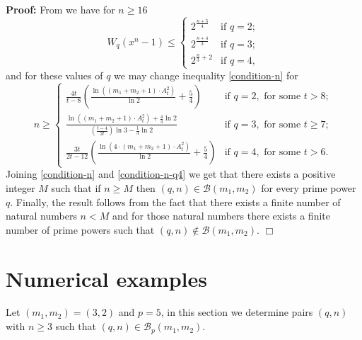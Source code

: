 \documentclass[12pt]{article}
\newenvironment{proof}{\noindent \textbf{Proof: }}{\hfill
$\Box$  \vspace{1ex}}
\def\Bb {\mathcal{B}}
\begin{document}
\begin{proof}
	From \cite[Lemma 2.11]{Lenstra} we have for $n \geq 16$
	$$
	W_q(x^n-1) \leq 
	\left\{
	\begin{array}{ll}
	2^{\frac{n+5}{4}} & \text{if } q=2;\\
	2^{\frac{n+4}{3}} & \text{if } q=3;\\
	2^{\frac{n}{3}+2} & \text{if } q=4,
	\end{array}
	\right.
	$$
	and for these values of $q$ we may change inequality \eqref{condition-n} for
	\begin{equation}\label{condition-n-q4}
		n \geq
		\left\{
		\begin{array}{ll}
			\frac{4t}{t-8}
			\left(
			\frac{\ln ((m_1+m_2+1)\cdot A_t^2)}{\ln 2} + \frac{5}{4}
			\right)
			& \text{if } q=2, \text{ for some } t > 8; \\
			\frac{\ln ((m_1+m_2+1)\cdot A_t^2) + \frac{4}{3} \ln 2}%
			{\left( \frac{t-4}{2t} \right) \ln 3 - \frac{1}{3} \ln 2} 
			& \text{if } q=3, \text{ for some } t \geq 7;\\
			\frac{3t}{2t-12}
			\left(
			\frac{\ln (4\cdot (m_1+m_2+1)\cdot A_t^2)}{\ln 2} + \frac{5}{4}
			\right)
			& \text{if } q=4, \text{ for some } t > 6.
		\end{array}
		\right.
	\end{equation}
	Joining \eqref{condition-n} and \eqref{condition-n-q4} we get that 
	there exists a positive integer $M$ such that if $n \geq M$ then
	$(q,n)\in \Bb(m_1,m_2)$ for every prime power $q$. Finally,
	the result follows from the fact that there exists a finite number of 
	natural numbers
	$n<M$ and for those natural numbers there exists a finite number of prime 
	powers
	such that $(q,n)\notin \Bb(m_1,m_2)$.
\end{proof}





\section{Numerical examples}

Let $(m_1,m_2)=(3,2)$ and $p=5$, 
in this section we determine pairs $(q,n)$ with $n \geq 3$ such that  $(q,n) 
\in \Bb_p(m_1,m_2)$.


%
\end{document}
